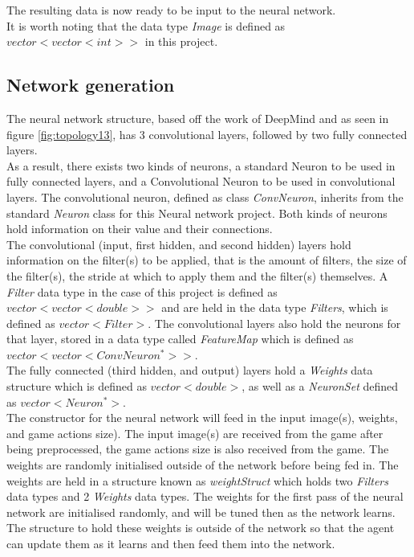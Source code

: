\documentclass[10pt]{article}
\begin{document}
	The resulting data is now ready to be input to the neural network.\\
	
	It is worth noting that the data type \textit{Image} is defined as $vector<vector<int>>$ in this project.
	\medskip
	
	\subsection{Network generation}
	
	The neural network structure, based off the work of DeepMind and as seen in figure \ref{fig:topology13}, has 3 convolutional layers, followed by two fully connected layers.\\ 
	
	As a result, there exists two kinds of neurons, a standard Neuron to be used in fully connected layers, and a Convolutional Neuron to be used in convolutional layers. The convolutional neuron, defined as class \textit{ConvNeuron}, inherits from the standard \textit{Neuron} class for this Neural network project. Both kinds of neurons hold information on their value and their connections.\\
	
	The convolutional (input, first hidden, and second hidden) layers hold information on the filter(s) to be applied, that is the amount of filters, the size of the filter(s), the stride at which to apply them and the filter(s) themselves. A \textit{Filter} data type in the case of this project is defined as $vector<vector<double>>$ and are held in the data type \textit{Filters}, which is defined as $vector<Filter>$. The convolutional layers also hold the neurons for that layer, stored in a data type called \textit{FeatureMap} which is defined as $vector<vector<ConvNeuron^*>>$.\\
	
	The fully connected (third hidden, and output) layers hold a \textit{Weights} data structure which is defined as $vector<double>$, as well as a \textit{NeuronSet} defined as $vector<Neuron^*>$.\\
	
	The constructor for the neural network will feed in the input image(s), weights, and game actions size). The input image(s) are received from the game after being preprocessed, the game actions size is also received from the game. The weights are randomly initialised outside of the network before being fed in. The weights are held in a structure known as \textit{weightStruct} which holds two \textit{Filters} data types and 2 \textit{Weights} data types. The weights for the first pass of the neural network are initialised randomly, and will be tuned then as the network learns. The structure to hold these weights is outside of the network so that the agent can update them as it learns and then feed them into the network.\\
	
\end{document}
